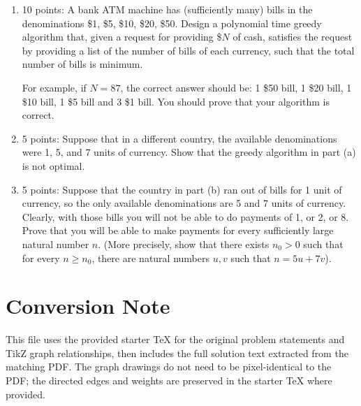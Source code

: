 \documentclass[12pt]{article}
\begin{document}
\begin{enumerate}
\item[(a)] 10 points: A bank ATM machine has (sufficiently many) bills in the denominations
\$1, \$5, \$10, \$20, \$50. Design a polynomial time greedy algorithm that, given a request for providing \$$N$ of cash, satisfies the request by
providing a list of the number of bills of each currency, such that the total number of bills is minimum. 

For example, if $N=87$,
the correct answer should be: 1 \$50 bill, 1 \$20 bill, 1 \$10 bill, 1 \$5 bill and 3 \$1 bill. 
You should  prove that your algorithm is correct.

\item [(b)] 5 points: Suppose that in a different country, the available denominations were 1, 5, and 7 units of currency. Show that the greedy algorithm in part (a) is not optimal.

\item [(c)] 5 points: Suppose that the country in part (b) ran out of bills for 1 unit of currency, so the only available denominations are 5 and 7 units of currency. Clearly, with those bills you will not be able to do payments of 1, or 2, or 8. Prove that you will be able to make payments for every sufficiently large natural number $n$. (More precisely, show that
there exists $n_0 > 0$ such that for every $n \geq n_0$, there are natural numbers $u,v$ such that $n=5u+7v$). 
\end{enumerate}



\newpage
\section*{Conversion Note}
This file uses the provided starter TeX for the original problem statements and TikZ graph relationships, then includes the full solution text extracted from the matching PDF. The graph drawings do not need to be pixel-identical to the PDF; the directed edges and weights are preserved in the starter TeX where provided.

\newpage
\end{document}
